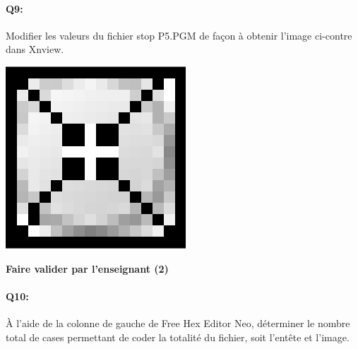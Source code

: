 \documentclass{article}
\begin{document}
\begin{minipage}[b]{.8\linewidth}
	\paragraph{Q9:}
	Modifier les valeurs du fichier \og{}stop P5.PGM\fg{} de façon à obtenir l'image ci-contre dans \og{}Xnview\fg{}.
	\vspace{2em}
\end{minipage}
\hfill
\begin{minipage}[b]{.12\linewidth}
	\includegraphics[width=\linewidth]{./figures/stop_modif.png}
\end{minipage}

\begin{center}
	\Large
	\textbf{Faire valider par l'enseignant (2)}
\end{center}

\paragraph{Q10:}
À l'aide de la colonne de gauche de \og{}Free Hex Editor Neo\fg{}, déterminer le nombre total de cases permettant de coder la totalité du fichier, 
soit l'entête et l'image.

\vspace{1em}
\begin{Form}
	\TextField[name=r10,width=\linewidth,height=5em,multiline=true]{}
\end{Form}
\end{document}
